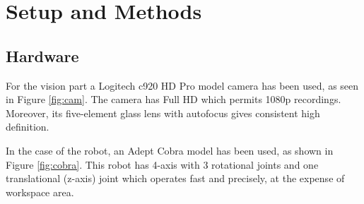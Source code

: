 \chapter{Setup and Methods}\label{ch:hardware}

\section{Hardware}

For the vision part a Logitech c920 HD Pro model camera has been used, as seen in Figure \ref{fig:cam}. The camera has Full HD which permits 1080p recordings. Moreover, its five-element glass lens with autofocus gives consistent high definition.

In the case of the robot, an Adept Cobra model has been used, as shown in Figure \ref{fig:cobra}. This robot has 4-axis with 3 rotational joints and one translational (z-axis) joint which operates fast and precisely, at the expense of workspace area. 

